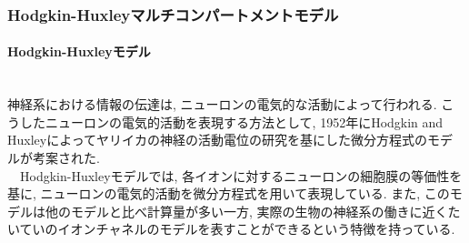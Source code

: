 \subsubsection{Hodgkin-Huxleyマルチコンパートメントモデル}
\label{subsec:hh-model}
\paragraph{Hodgkin-Huxleyモデル}~\\
神経系における情報の伝達は, ニューロンの電気的な活動によって行われる.
こうしたニューロンの電気的活動を表現する方法として,
1952年にHodgkin and Huxley\cite{hh}によってヤリイカの神経の活動電位の研究を基にした微分方程式のモデルが考案された.\\
　Hodgkin-Huxleyモデルでは, 各イオンに対するニューロンの細胞膜の等価性を基に, ニューロンの電気的活動を微分方程式を用いて表現している. また, このモデルは他のモデルと比べ計算量が多い一方, 実際の生物の神経系の働きに近くたいていのイオンチャネルのモデルを表すことができるという特徴を持っている.\\

